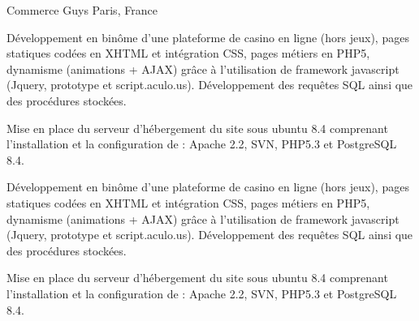 \cventry
{} %
{Commerce Guys} %
{Paris, France} %
{} %
{
\begin{cvsubentries}
    \begin{cvitems} %
        \item
        {
        Développement en binôme d’une plateforme de casino en ligne (hors jeux),
        pages statiques codées en XHTML et intégration CSS, pages métiers en PHP5, dynamisme
        (animations + AJAX) grâce à l’utilisation de framework javascript (Jquery, prototype et script.aculo.us).
        Développement des requêtes SQL ainsi que des procédures stockées.
        }
        \item
        {
        Mise en place du serveur d'hébergement du site sous ubuntu 8.4 comprenant l'installation et la
        configuration de : Apache 2.2, SVN, PHP5.3 et PostgreSQL 8.4.
        }
    \end{cvitems}
    \begin{cvitems} %
        \item
        {
        Développement en binôme d’une plateforme de casino en ligne (hors jeux),
        pages statiques codées en XHTML et intégration CSS, pages métiers en PHP5, dynamisme
        (animations + AJAX) grâce à l’utilisation de framework javascript (Jquery, prototype et script.aculo.us).
        Développement des requêtes SQL ainsi que des procédures stockées.
        }
        \item
        {
        Mise en place du serveur d'hébergement du site sous ubuntu 8.4 comprenant l'installation et la
        configuration de : Apache 2.2, SVN, PHP5.3 et PostgreSQL 8.4.
        }
    \end{cvitems}
\end{cvsubentries}
}